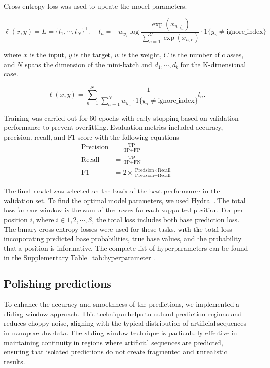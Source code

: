 \documentclass[pdflatex,sn-nature, lineno]{sn-jnl}%
\theoremstyle{thmstyleone}%
\theoremstyle{thmstyletwo}%
\theoremstyle{thmstylethree}%
\begin{document}
Cross-entropy loss was used to update the model parameters.

\[
	\ell(x, y) = L = \{l_1,\cdots,l_N\}^\top, \quad
	l_n = - w_{y_n} \log \frac{\exp(x_{n,y_n})}{\sum_{c=1}^C \exp(x_{n,c})}
	\cdot 1\{y_n \not= \textrm{ignore\_index}\}
\]

where \( x \) is the input, \( y \) is the target, \( w \) is the weight,
\( C \) is the number of classes, and \( N \) spans the dimension of the mini-batch and
\( d_1, \cdots, d_k \) for the K-dimensional case.

\[
	\ell(x, y) =   \sum_{n=1}^N \frac{1}{\sum_{n=1}^N w_{y_n} \cdot 1\{y_n \not= \textrm{ignore\_index}\}} l_n
	.\]

Training was carried out for \num{60} epochs with early stopping based on validation performance to prevent overfitting.
Evaluation metrics included accuracy, precision, recall, and F1 score with the following equations:
\begin{align*}
	\textrm{Precision} & = \frac{\textrm{TP}}{\textrm{TP}+\textrm{FP}}                                                     \\
	\textrm{Recall}    & = \frac{\textrm{TP}}{\textrm{TP}+\textrm{FN}}                                                     \\
	\textrm{F1}        & = 2 \times \frac{\textrm{Precision} \times \textrm{Recall}}{\textrm{Precision} + \textrm{Recall}}
\end{align*}

The final model was selected on the basis of the best performance in the validation set.
To find the optimal model parameters, we used Hydra~\cite{Yadan2019Hydra}.
The total loss for one window is the sum of the losses for each supported position.
For per position \( i \), where \( i  \in {1, 2, \cdots, S} \),  the total loss includes both base prediction loss.
The binary cross-entropy losses were used for these tasks, with the total loss incorporating predicted base probabilities, true base values, and the probability that a position is informative.
The complete list of hyperparameters can be found in the Supplementary Table~\ref{tab:hyperparameter}.

\subsection{Polishing predictions}

To enhance the accuracy and smoothness of the predictions, we implemented a sliding window approach.
This technique helps to extend prediction regions and reduces choppy noise, aligning with the typical distribution of artificial sequences in nanopore \gls{drs} data.
The sliding window technique is particularly effective in maintaining continuity in regions where artificial sequences are predicted, ensuring that isolated predictions do not create fragmented and unrealistic results.
\end{document}
